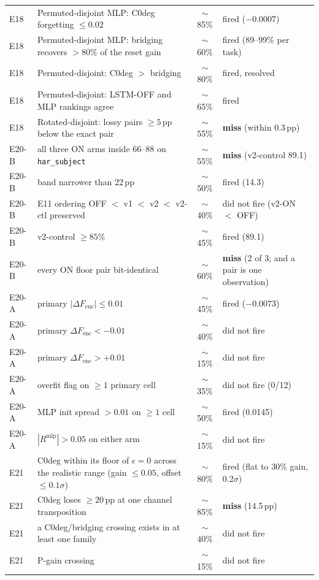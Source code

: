 \begin{center}
\begin{tabular}{@{}llcl@{}}
E18 & Permuted-disjoint MLP: C0deg forgetting $\le 0.02$ & $\sim$85\% & fired ($-0.0007$) \\
E18 & Permuted-disjoint MLP: bridging recovers $> 80\%$ of the reset gain & $\sim$60\% & fired (89--99\% per task) \\
E18 & Permuted-disjoint: C0deg $>$ bridging & $\sim$80\% & fired, resolved \\
E18 & Permuted-disjoint: LSTM-OFF and MLP rankings agree & $\sim$65\% & fired \\
E18 & Rotated-disjoint: lossy pairs $\ge 5$\,pp below the exact pair & $\sim$55\% & \textbf{miss} (within 0.3\,pp) \\
E20-B & all three ON arms inside 66--88 on \texttt{har\_subject} & $\sim$55\% & \textbf{miss} (v2-control 89.1) \\
E20-B & band narrower than 22\,pp & $\sim$50\% & fired (14.3) \\
E20-B & E11 ordering OFF $<$ v1 $<$ v2 $<$ v2-ctl preserved & $\sim$40\% & did not fire (v2-ON $<$ OFF) \\
E20-B & v2-control $\ge 85\%$ & $\sim$45\% & fired (89.1) \\
E20-B & every ON floor pair bit-identical & $\sim$60\% & \textbf{miss} (2 of 3; and a pair is one observation) \\
E20-A & primary $|\Delta F_{\mathrm{enc}}| \le 0.01$ & $\sim$45\% & fired ($-0.0073$) \\
E20-A & primary $\Delta F_{\mathrm{enc}} < -0.01$ & $\sim$40\% & did not fire \\
E20-A & primary $\Delta F_{\mathrm{enc}} > +0.01$ & $\sim$15\% & did not fire \\
E20-A & overfit flag on $\ge 1$ primary cell & $\sim$35\% & did not fire (0/12) \\
E20-A & MLP init spread $> 0.01$ on $\ge 1$ cell & $\sim$50\% & fired (0.0145) \\
E20-A & $|R^{\mathrm{mlp}}| > 0.05$ on either arm & $\sim$15\% & did not fire \\
E21 & C0deg within its floor of $\epsilon=0$ across the realistic range (gain $\le 0.05$, offset $\le 0.1\sigma$) & $\sim$80\% & fired (flat to 30\% gain, 0.2$\sigma$) \\
E21 & C0deg loses $\ge 20$\,pp at one channel transposition & $\sim$85\% & \textbf{miss} (14.5\,pp) \\
E21 & a C0deg/bridging crossing exists in at least one family & $\sim$40\% & did not fire \\
E21 & P-gain crossing & $\sim$15\% & did not fire \\

\end{tabular}
\end{center}
